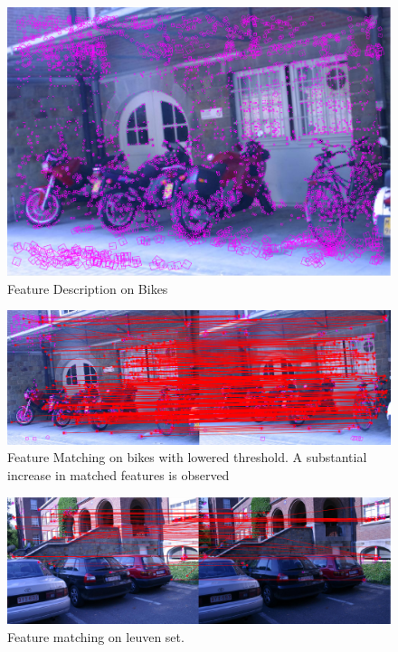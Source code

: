 \documentclass[12pt,journal,compsoc]{IEEEtran}
\begin{document}
\begin{figure}[h]
	\centering
		  \centering
		  \includegraphics[width=1\linewidth]{img/bikes2b}
		  \caption{Feature Description on Bikes}
		  \label{fig:bikes2}
\end{figure}


\begin{figure}[h]
	\centering
		  \centering
		  \includegraphics[width=1\linewidth]{img/bikes1}
		  \caption{Feature Matching on bikes with lowered threshold. A substantial increase in matched features is observed}
		  \label{fig:bikes1}
\end{figure}



\begin{figure}[h]
	\centering
		  \centering
		  \includegraphics[width=1\linewidth]{img/car1}
		  \caption{Feature matching on leuven set.}
		  \label{fig:car1}
\end{figure}
\end{document}
